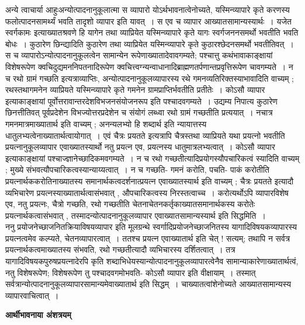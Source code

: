 \documentclass[11pt, openany]{book}
\begin{document}
 अन्ये त्वाचार्या आहुः\textendash अन्योत्पादनानुकूलात्मा स व्यापारो योऽर्थभावनात्वेनोच्यते, यस्मिन्व्यापारे कृते करणस्य फलोत्पादनसामर्थ्यं भवति तादृशो व्यापार इति यावत्~। स एव च व्यापार आख्यातसामान्यस्यार्थः~। {\qt यजेत स्वर्गकामः} इत्याख्यातश्रवणे हि यागेन तथा व्याप्रियेत यस्मिन्व्यापारे कृते यागः स्वर्गजननसमर्थो भवतीति भवति बोधः~। कुठारेण छिन्द्यादिति कुठारेण तथा व्याप्रियेत यस्मिन्व्यापारे कृते कुठारश्छेदनसमर्थो भवतीतिवत्~। स च
\newpage
\fancyhead[RE]{[आर्थीभावनालक्षणम् ]} 
\noindent
व्यापारोऽन्योत्पादनानुकूलत्वेन सामान्येन रूपेणाख्यातादेवावगम्यते; पश्चात्तु कथंभावाकाङ्क्षायां विशेषरूपेण क्वचिदुद्यमननिपतनादिरूपेण क्वचित्त्वग्न्यन्वाधानादिब्राह्मणतर्पणान्तप्रवृत्तिरूपेण चावगम्यते~। न च {\qt रथो ग्रामं गच्छति} इत्यत्राव्याप्तिः, अन्योत्पादनानुकूलव्यापारस्य रथे गमनव्यतिरिक्तस्याभावादिति वाच्यम् ; रथस्तथागमनेन व्याप्रियते यस्मिन्व्यापारे कृते गमनेन ग्रामप्राप्तिर्भवतीति प्रतीतेः~। कोऽसौ व्यापार इत्याकाङ्क्षायां पूर्वोत्तरावान्तरदेशविभजनसंयोजनरूप इति
पश्चादवगम्यते~। उद्यम्य निपात्य कुठारेण छिनत्तीतिवत् पूर्वप्रदेशेन विभज्योत्तरप्रदेशेन च संयोगं लब्ध्वा रथो ग्रामं गच्छतीति प्रत्ययात्~। नचात्र गमनमात्रमाख्यातार्थ इति वाच्यम् ; {\qt अनन्यलभ्यो हि शब्दार्थ} इति न्यायात्तस्य धातुलभ्यत्वेनाख्यातार्थत्वायोगात्~। एवं {\qt चैत्रः प्रयतते} इत्यत्रापि चैत्रस्तथा व्याप्रियते यथा प्रयत्नो भवतीति
प्रयत्नानुकूलव्यापार एवाख्यातस्यार्थो नतु प्रयत्न एव, प्रयत्नस्य धातुमात्रलभ्यत्वात्~। कोऽसौ व्यापार इत्याकाङ्क्षायां पश्चाज्ज्ञानेच्छादिकमवगम्यते~। न च रथो गच्छतीत्यादिप्रयोगस्यौपचारिकत्वं स्यादिति वाच्यम् ; मुख्ये संभवत्यौपचारिकत्वस्यान्याय्यत्वात्~। न च गच्छति- {\qt गमनं करोति}, पचति- {पाकं करोतीति} प्रयत्नार्थककरोतिनाख्यातस्य समानार्थकत्वदर्शनात्प्रयत्न एवाख्यातस्यार्थ इति वाच्यम् ; {\qt चैत्रः प्रयतते} इत्यादौ व्यभिचारेण प्रयत्नस्याख्यातार्थत्वासंभवात् , औपचारिकत्वस्य निरस्तत्वाच्च~। करोत्यर्थोऽपि व्यापारविशेष एव, नतु प्रयत्नः, चैत्रो गच्छति, रथो गच्छतीति चेतनाचेतनकर्तृकाख्यातसमानार्थकस्य करोतेः प्रयत्नार्थकत्वासंभवात् , तस्मादन्योत्पादनानुकूलव्यापार एवाख्यातसामान्यस्यार्थ इति सिद्धमिति~। \\

 {\br ननु} प्रयोजनेच्छाजनितक्रियाविषयव्यापार इति मूलग्रन्थे स्वर्गादिप्रयोजनेच्छाजनितस्य यागादिविषयकव्यापारस्य प्रयत्नत्वमेव कल्प्यते, चेतनव्यापारत्वात्~। ततश्च प्रयत्न एवाख्यातार्थ इति चेत् ! सत्यम्; तथापि न सर्वत्र प्रयत्नार्थकत्वमाख्यातस्य संभवति, रथो गच्छतीत्यादौ व्यभिचारस्य दर्शितत्वात्~। तत्र यागादिविषयकपुरुषप्रयत्नादेरपि
{\qt कृति} शब्दाभिधेयस्यान्योत्पादनानुकूलव्यापारत्वेनैव सामान्याकारेणाख्यातार्थत्वं, नतु विशेषरूपेण; विशेषरूपेण तु पश्चादवगमोभवति- कोऽसौ व्यापार इति वीक्षायाम्~। तस्मात् सर्वत्रान्योत्पादनानुकूलव्यापारसामान्यमेवाख्यातार्थ इति सिद्धम्~।
\newpage
\fancyhead[LO]{[ आर्थीभावनांशत्रयम् ]} 
{\bl\noindent
चाख्यातत्वांशेनोच्यते आख्यातसामान्यस्य व्यापारवाचित्वात्~।~}
\begin{center}
\textbf{आर्थीभावनाया अंशत्रयम्}    
\end{center}
\end{document}
